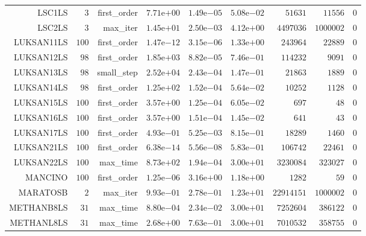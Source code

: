\begin{longtable}{rrrrrrrrr}
LSC1LS & \(     3\) & first\_order & \( 7.71\)e\(+00\) & \( 1.49\)e\(-05\) & \( 5.08\)e\(-02\) & \( 51631\) & \( 11556\) & \(     0\) \\
LSC2LS & \(     3\) & max\_iter & \( 1.45\)e\(+01\) & \( 2.50\)e\(-03\) & \( 4.12\)e\(+00\) & \(4497036\) & \(1000002\) & \(     0\) \\
LUKSAN11LS & \(   100\) & first\_order & \( 1.47\)e\(-12\) & \( 3.15\)e\(-06\) & \( 1.33\)e\(+00\) & \(243964\) & \( 22889\) & \(     0\) \\
LUKSAN12LS & \(    98\) & first\_order & \( 1.85\)e\(+03\) & \( 8.82\)e\(-05\) & \( 7.46\)e\(-01\) & \(114232\) & \(  9091\) & \(     0\) \\
LUKSAN13LS & \(    98\) & small\_step & \( 2.52\)e\(+04\) & \( 2.43\)e\(-04\) & \( 1.47\)e\(-01\) & \( 21863\) & \(  1889\) & \(     0\) \\
LUKSAN14LS & \(    98\) & first\_order & \( 1.25\)e\(+02\) & \( 1.52\)e\(-04\) & \( 5.64\)e\(-02\) & \( 10252\) & \(  1128\) & \(     0\) \\
LUKSAN15LS & \(   100\) & first\_order & \( 3.57\)e\(+00\) & \( 1.25\)e\(-04\) & \( 6.05\)e\(-02\) & \(   697\) & \(    48\) & \(     0\) \\
LUKSAN16LS & \(   100\) & first\_order & \( 3.57\)e\(+00\) & \( 1.51\)e\(-04\) & \( 1.45\)e\(-02\) & \(   641\) & \(    43\) & \(     0\) \\
LUKSAN17LS & \(   100\) & first\_order & \( 4.93\)e\(-01\) & \( 5.25\)e\(-03\) & \( 8.15\)e\(-01\) & \( 18289\) & \(  1460\) & \(     0\) \\
LUKSAN21LS & \(   100\) & first\_order & \( 6.38\)e\(-14\) & \( 5.56\)e\(-08\) & \( 5.83\)e\(-01\) & \(106742\) & \( 22461\) & \(     0\) \\
LUKSAN22LS & \(   100\) & max\_time & \( 8.73\)e\(+02\) & \( 1.94\)e\(-04\) & \( 3.00\)e\(+01\) & \(3230084\) & \(323027\) & \(     0\) \\
MANCINO & \(   100\) & first\_order & \( 1.25\)e\(-06\) & \( 3.16\)e\(+00\) & \( 1.18\)e\(+00\) & \(  1282\) & \(    59\) & \(     0\) \\
MARATOSB & \(     2\) & max\_iter & \( 9.93\)e\(-01\) & \( 2.78\)e\(-01\) & \( 1.23\)e\(+01\) & \(22914151\) & \(1000002\) & \(     0\) \\
METHANB8LS & \(    31\) & max\_time & \( 8.80\)e\(-04\) & \( 2.34\)e\(-02\) & \( 3.00\)e\(+01\) & \(7252604\) & \(386122\) & \(     0\) \\
METHANL8LS & \(    31\) & max\_time & \( 2.68\)e\(+00\) & \( 7.63\)e\(-01\) & \( 3.00\)e\(+01\) & \(7010532\) & \(358755\) & \(     0\) \\

\end{longtable}
